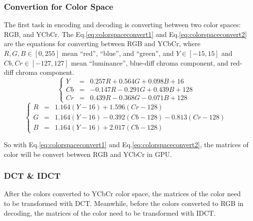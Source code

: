 \documentclass{article}
\begin{document}
\subsubsection{Convertion for Color Space}
\label{sec:hpeg:inside:cfcs}

The first task in encoding and decoding is converting between two color spaces: RGB, and YCbCr.
The Eq.\ref{eq:colorspaceconvert1} and Eq.\ref{eq:colorspaceconvert2} are the equations for converting
between RGB and YCbCr, where $R,G,B \in \left[0,255\right]$ mean ``red'', ``blue'', and ``green'',
and $Y \in \left[-15,15\right]$ and $Cb,Cr \in \left[-127,127\right]$ mean ``luminance'', blue-diff chroma component, and red-diff chroma component.
\begin{equation}
    \label{eq:colorspaceconvert1}
    \left\{\begin{array}{rcl}
    Y  &=& 0.257R+0.564G+0.098B+16 \\
    Cb &=& -0.147R-0.291G+0.439B+128 \\
    Cr &=& 0.439R-0.368G-0.071B+128
    \end{array}\right.
\end{equation}
\begin{equation}
    \label{eq:colorspaceconvert2}
    \left\{\begin{array}{rcl}
    R &=& 1.164(Y-16) + 1.596(Cr-128) \\
    G &=& 1.164(Y-16) - 0.392(Cb-128)-0.813(Cr-128) \\
    B &=& 1.164(Y-16) + 2.017(Cb-128)
    \end{array}\right.
\end{equation}

So with Eq.\ref{eq:colorspaceconvert1} and Eq.\ref{eq:colorspaceconvert2},
the matrices of color will be convert between RGB and YCbCr in GPU.

\subsubsection{DCT \& IDCT}
\label{sec:hpeg:inside:dct}

After the colors converted to YCbCr color space, the matrices of the color need to be transformed with DCT.
Meanwhile, before the colors converted to RGB in decoding, the matrices of the color need to be transformed
with IDCT.
\end{document}
